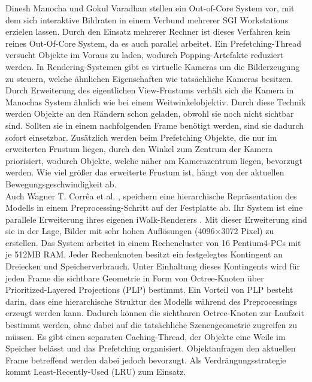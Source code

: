 Dinesh Manocha und Gokul Varadhan \cite{manocha} stellen ein Out-of-Core System vor, mit dem sich interaktive Bildraten in einem Verbund mehrerer SGI Workstations erzielen lassen. Durch den Einsatz mehrerer Rechner ist dieses Verfahren kein reines Out-Of-Core System, da es auch parallel arbeitet. Ein Prefetching-Thread versucht Objekte im Voraus zu laden, wodurch Popping-Artefakte reduziert werden. In Rendering-Systemen gibt es virtuelle Kameras um die Bilderzeugung zu steuern,  welche ähnlichen Eigenschaften wie tatsächliche Kameras besitzen. Durch Erweiterung des eigentlichen View-Frustums verhält sich die Kamera in Manochas System ähnlich wie bei einem Weitwinkelobjektiv. Durch diese Technik werden Objekte an den Rändern schon geladen, obwohl sie noch nicht sichtbar sind. Sollten sie in einem nachfolgenden Frame benötigt werden, sind sie dadurch sofort einsetzbar. Zusätzlich werden beim Prefetching Objekte, die nur im erweiterten Frustum liegen, durch den Winkel zum Zentrum der Kamera priorisiert, wodurch Objekte, welche näher am Kamerazentrum liegen, bevorzugt werden. Wie viel größer das erweiterte Frustum ist, hängt von der aktuellen Bewegungsgeschwindigkeit ab.\\
Auch Wagner T. Corr\^{e}a et al. \cite{wagner1}, \cite{wagner2} speichern eine hierarchische Repräsentation des Modells in einem Preprocessing-Schritt auf der Festplatte ab. Ihr System ist eine parallele Erweiterung ihres eigenen iWalk-Renderers \cite{iwalk}. Mit dieser Erweiterung sind sie in der Lage, Bilder mit sehr hohen Auflösungen (4096$\times$3072 Pixel) zu erstellen. Das System arbeitet in einem Rechencluster von 16 Pentium4-PCs mit je 512MB RAM. Jeder Rechenknoten besitzt ein festgelegtes Kontingent an Dreiecken und Speicherverbrauch. Unter Einhaltung dieses Kontingents wird für jeden Frame die sichtbare Geometrie in Form von Octree-Knoten über Prioritized-Layered Projections (PLP) \cite{plp} bestimmt. Ein Vorteil von PLP besteht darin, dass eine hierarchische Struktur des Modells während des Preprocessings erzeugt werden kann. Dadurch können die sichtbaren Octree-Knoten zur Laufzeit bestimmt werden, ohne dabei auf die tatsächliche Szenengeometrie zugreifen zu müssen. Es gibt einen separaten Caching-Thread, der Objekte eine Weile im Speicher belässt und das Prefetching organisiert. Objektanfragen den aktuellen Frame betreffend werden dabei jedoch bevorzugt. Als Verdrängungsstrategie kommt Least-Recently-Used (LRU) zum Einsatz.\\
